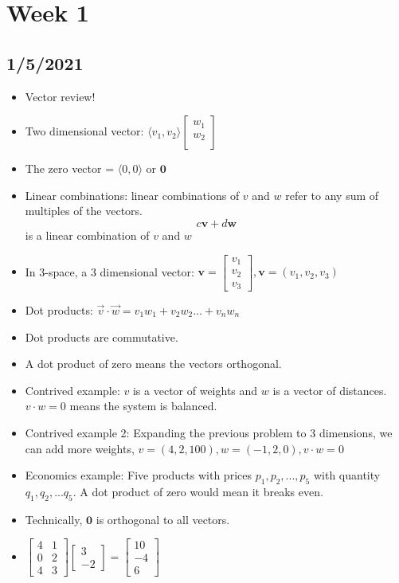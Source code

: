 \section{Week 1}
\subsection{1/5/2021}
\begin{itemize}
    \item Vector review!
    \item Two dimensional vector: $\langle v_1, v_2 \rangle \begin{bmatrix}
        w_1 \\
        w_2 \\
    \end{bmatrix}$
    \item The zero vector = $\langle 0, 0 \rangle$ or $\textbf{0}$
    \item Linear combinations: linear combinations of $v$ and $w$ refer to any sum of multiples of the vectors. $$c\textbf{v} + d\textbf{w}$$ is a linear combination of $v$ and $w$
    \item In 3-space, a 3 dimensional vector: $\textbf{v} = \begin{bmatrix} v_1 \\ v_2 \\ v_3 \end{bmatrix}, \textbf{v} = (v_1, v_2, v_3)$
    \item Dot products: $\Vec{v} \cdot \Vec{w} = v_1w_1+v_2w_2...+v_nw_n$
    \item Dot products are commutative.
    \item A dot product of zero means the vectors orthogonal.
    \item Contrived example: $v$ is a vector of weights and $w$ is a vector of distances. $v \cdot w = 0$ means the  system is balanced.
    \item Contrived example 2: Expanding the previous problem to 3 dimensions, we can add more weights, $v= (4,2,100), w=(-1,2,0), v\cdot w = 0$
    \item Economics example: Five products with prices $p_1, p_2, ..., p_5$ with quantity $q_1, q_2, ... q_5$. A dot product of zero would mean it breaks even.
    \item Technically, $\textbf{0}$ is orthogonal to all vectors.
    \item $\begin{bmatrix} 4 & 1 \\ 0 & 2 \\ 4 & 3\end{bmatrix} \begin{bmatrix} 3 \\ -2 \end{bmatrix} = \begin{bmatrix} 10 \\ -4 \\ 6\end{bmatrix}$

\end{itemize}
